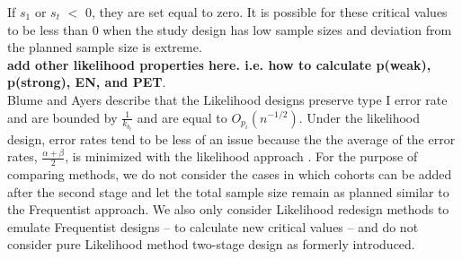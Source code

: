 \documentclass[12pt]{report}\usepackage[]{graphicx}\usepackage[]{color}
\newlength{\li}\setlength{\li}{14.48pt}
\begin{document}
If $s_1$ or $s_t$ $<$ 0, they are set equal to zero. It is possible for these critical values to be less than 0 when the study design has low sample sizes and deviation from the planned sample size is extreme. \\
\textbf{add other likelihood properties here. i.e. how to calculate p(weak), p(strong), EN, and PET}. \\

\indent Blume and Ayers describe that the Likelihood designs preserve type I error rate and are bounded by $\frac{1}{k_{b_t}}$ and are equal to $O_{p_i}\left({n}^{-1/2}\right)$. Under the likelihood design, error rates tend to be less of an issue because the the average of the error rates, $\frac{\alpha + \beta}{2}$, is minimized with the likelihood approach \cite{Blume}. For the purpose of comparing methods, we do not consider the cases in which cohorts can be added after the second stage and let the total sample size remain as planned similar to the Frequentist approach. We also only consider Likelihood redesign methods to emulate Frequentist designs -- to calculate new critical values -- and do not consider pure Likelihood method two-stage design as formerly introduced. 
\end{document}
